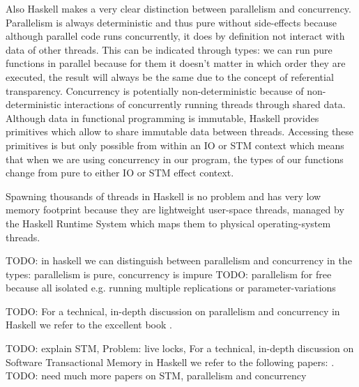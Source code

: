 Also Haskell makes a very clear distinction between parallelism and concurrency. Parallelism is always deterministic and thus pure without side-effects because although parallel code runs concurrently, it does by definition not interact with data of other threads. This can be indicated through types: we can run pure functions in parallel because for them it doesn't matter in which order they are executed, the result will always be the same due to the concept of referential transparency. Concurrency is potentially non-deterministic because of non-deterministic interactions of concurrently running threads through shared data. Although data in functional programming is immutable, Haskell provides primitives which allow to share immutable data between threads. Accessing these primitives is but only possible from within an IO or STM context which means that when we are using concurrency in our program, the types of our functions change from pure to either IO or STM effect context.

Spawning thousands of threads in Haskell is no problem and has very low memory footprint because they are lightweight user-space threads, managed by the Haskell Runtime System which maps them to physical operating-system threads. 

TODO: in haskell we can distinguish between parallelism and concurrency in the types: parallelism is pure, concurrency is impure
TODO: parallelism for free because all isolated e.g. running multiple replications or parameter-variations

TODO: For a technical, in-depth discussion on parallelism and concurrency in Haskell we refer to the excellent book \cite{marlow_parallel_2013}.

TODO: explain STM, Problem: live locks, For a technical, in-depth discussion on Software Transactional Memory in Haskell we refer to the following papers: \citep{harris_composable_2005, discolo_lock_2006, osullivan_real_2008, perfumo_limits_2008}. TODO: need much more papers on STM, parallelism and concurrency

